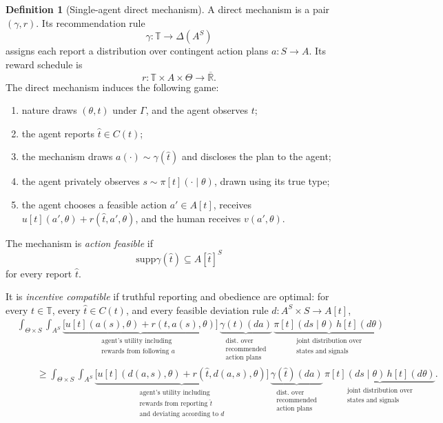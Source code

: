 \documentclass[12pt,reqno]{article}
\newcommand{\supp}{\mathrm{supp}}
\newcommand{\Rbar}{\overline{\mathbb{R}}}
\theoremstyle{definition} \newtheorem{example}{Example}
\theoremstyle{definition} \newtheorem{condition}{Condition}
\theoremstyle{definition} \newtheorem{corollary}{Corollary}
\theoremstyle{definition} \newtheorem{claim}{Claim}
\theoremstyle{definition} \newtheorem{definition}{Definition}
\theoremstyle{definition} \newtheorem{conjecture}{Conjecture}
\theoremstyle{definition} \newtheorem{Lemma}{Lemma}
\theoremstyle{definition} \newtheorem{lemma}{Lemma}
\theoremstyle{plain} \newtheorem{theorem}{Theorem}
\theoremstyle{definition} \newtheorem{assumption}{Assumption}
\theoremstyle{definition} \newtheorem*{assumptionnonumber}{Assumption}
\theoremstyle{definition} \newtheorem*{theoremNoNumber}{Proposition}
\theoremstyle{definition}\newtheorem{proposition}{Proposition}
\theoremstyle{definition} \newtheorem{observation}{Observation}
\theoremstyle{definition} \newtheorem*{definitionNoNumber}{Definition}
\theoremstyle{definition} \newtheorem{Definition}{Definition}
\theoremstyle{definition} \newtheorem*{DefinitionNoNumber}{Definition}
\theoremstyle{definition} \newtheorem*{fact}{Fact}
\theoremstyle{definition} \newtheorem*{property}{Property}
\theoremstyle{definition} \newtheorem{remark}{Remark}
\theoremstyle{definition}\newtheorem{romanexampleinner}{Example}
\begin{document}
\begin{definition}[Single-agent direct mechanism]\label{def:direct-single}
A direct mechanism is a pair \((\gamma,r)\). 
Its recommendation rule
\[
\gamma:\mathbb T\to\Delta(A^S)
\]
assigns each report a distribution over contingent action plans \(a:S\to A\). Its reward schedule is
\[
r:\mathbb T\times A\times\Theta\to\Rbar.
\]
The direct mechanism induces the following game:
\begin{enumerate}
    \item nature draws \((\theta,t)\) under \(\Gamma\), and the agent observes \(t\);
    \item the agent reports \(\hat t\in C(t)\);
    \item the mechanism draws \(a(\cdot)\sim\gamma(\hat t)\) and discloses the plan to the agent;
    \item the agent privately observes \(s\sim\pi[t](\cdot\mid\theta)\), drawn using its true type;
    \item the agent chooses a feasible action \(a'\in A[t]\), receives \(u[t](a',\theta)+r(\hat t,a',\theta)\), and the human receives \(v(a',\theta)\).
\end{enumerate}
The mechanism is \emph{action feasible} if
\[
\supp\gamma(\hat t)\subseteq A[\hat t]^S
\]
for every report \(\hat t\).
\begin{samepage}
It is \emph{incentive compatible} if truthful reporting and obedience are optimal: for every \(t\in\mathbb T\), every {\(\hat t\in C(t)\)}, and every feasible deviation rule \(d:A^S\times S\to A[t]\),
{\small
\begin{align*}
&\int_{\Theta\times S}\int_{A^S}
\underbrace{\bigg[u[t](a(s),\theta)+r(t,a(s),\theta)\bigg]}
_{\substack{\text{agent's utility including}\\\text{rewards from following $a$ }}}
\,\underbrace{\gamma(t)(da)}
_{\substack{\text{dist. over}\\\text{recommended} \\ \text{action plans}}}
\,\underbrace{\pi[t](ds\mid\theta)\,h[t](d\theta)}
_{\substack{\text{joint distribution over}\\\text{states and signals}}}\\
&\qquad\geq
\int_{\Theta\times S}\int_{A^S}
\underbrace{\bigg[u[t](d(a,s),\theta)
+r(\hat t,d(a,s),\theta)\bigg]}
_{\substack{\text{agent's utility including}\\\text{rewards from reporting $\hat t$}\\\text{and deviating according to $d$}}}
\,\underbrace{\gamma(\hat t)(da)}
_{\substack{\text{dist. over}\\\text{recommended}\\\text{action plans}}}
\,\underbrace{\pi[t](ds\mid\theta)\,h[t](d\theta)}
_{\substack{\text{joint distribution over}\\\text{states and signals}}}.
\end{align*}
}
\end{samepage}
\end{definition}
\end{document}
